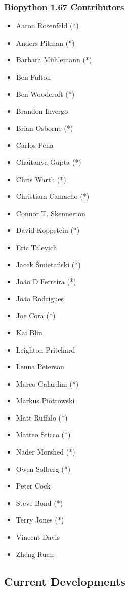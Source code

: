 \documentclass[trans]{beamer}
\begin{document}
\frame
{
  \frametitle{Biopython 1.67 Contributors}

  \scriptsize{
  \begin{multicols}{2}
  \begin{itemize}
  \item Aaron Rosenfeld (*)
  \item Anders Pitman (*)
  \item Barbara Mühlemann (*)
  \item Ben Fulton
  \item Ben Woodcroft (*)
  \item Brandon Invergo
  \item Brian Osborne (*)
  \item Carlos Pena
  \item Chaitanya Gupta (*)
  \item Chris Warth (*)
  \item Christiam Camacho (*)
  \item Connor T. Skennerton
  \item David Koppstein (*)
  \item Eric Talevich
  \item Jacek Śmietański (*)
  \item João D Ferreira (*)
  \item João Rodrigues
  \item Joe Cora (*)
  \item Kai Blin
  \item Leighton Pritchard
  \item Lenna Peterson
  \item Marco Galardini (*)
  \item Markus Piotrowski
  \item Matt Ruffalo (*)
  \item Matteo Sticco (*)
  \item Nader Morshed (*)
  \item Owen Solberg (*)
  \item Peter Cock
  \item Steve Bond (*)
  \item Terry Jones (*)
  \item Vincent Davis
  \item Zheng Ruan
  \end{itemize}
  \end{multicols}
  }
}

\subsection*{Current Developments}
\frame
{
}
\end{document}
